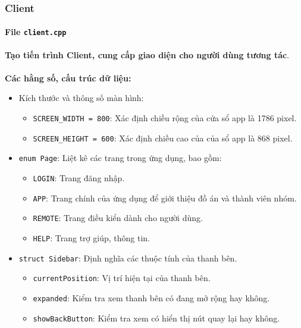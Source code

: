 \newpage
\subsubsection{Client}

\paragraph{File \texttt{client.cpp}}{\textbf{Tạo tiến trình Client, cung cấp giao diện cho người dùng tương tác}.}

\paragraph{}{\textbf{Các hằng số, cấu trúc dữ liệu:}}
\begin{itemize}
    \item Kích thước và thông số màn hình:
    \begin{itemize}
        \item \texttt{SCREEN\_WIDTH = 800}: Xác định chiều rộng của cửa sổ app là 1786 pixel.
        \item \texttt{SCREEN\_HEIGHT = 600}: Xác định chiều cao của của sổ app là 868 pixel.
    \end{itemize}

    \item \texttt{enum Page}: Liệt kê các trang trong ứng dụng, bao gồm:
    \begin{itemize}
        \item \texttt{LOGIN}: Trang đăng nhập.
        \item \texttt{APP}: Trang chính của ứng dụng để giới thiệu đồ án và thành viên nhóm. 
        \item \texttt{REMOTE}: Trang điều kiển dành cho người dùng.
        \item \texttt{HELP}: Trang trợ giúp, thông tin.
    \end{itemize}

    \item \texttt{struct Sidebar}: Định nghĩa các thuộc tính của thanh bên.
    \begin{itemize}
        \item \texttt{currentPosition}: Vị trí hiện tại của thanh bên.
        \item \texttt{expanded}: Kiểm tra xem thanh bên có đang mở rộng hay không.
        \item \texttt{showBackButton}: Kiểm tra xem có hiển thị nút quay lại hay không.
    \end{itemize}


\end{itemize}
